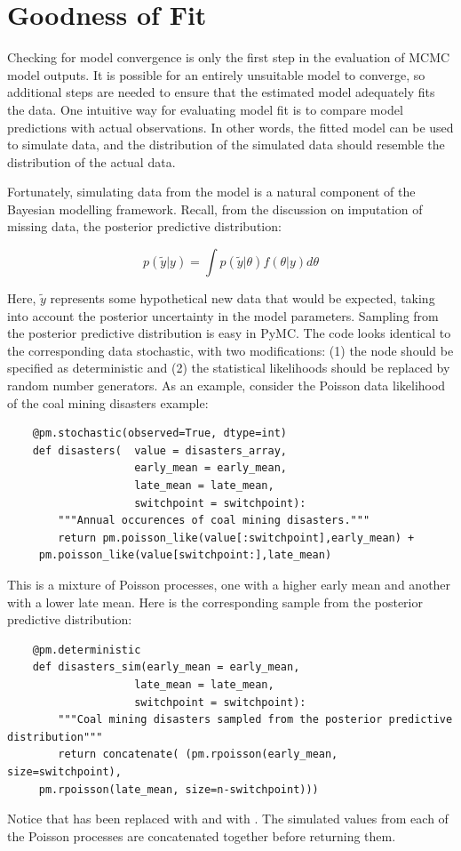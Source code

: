 
\hypertarget{gof}{}
\section{Goodness of Fit} %

Checking for model convergence is only the first step in the evaluation of MCMC model outputs. It is possible for an entirely unsuitable model to converge, so additional steps are needed to ensure that the estimated model adequately fits the data. One intuitive way for evaluating model fit is to compare model predictions with actual observations. In other words, the fitted model can be used to simulate data, and the distribution of the simulated data should resemble the distribution of the actual data.

Fortunately, simulating data from the model is a natural component of the Bayesian modelling framework. Recall, from the discussion on imputation of missing data, the posterior predictive distribution:

\begin{equation}
	p(\tilde{y}|y) = \int p(\tilde{y}|\theta) f(\theta|y) d\theta
\end{equation}

Here, $\tilde{y}$ represents some hypothetical new data that would be expected, taking into account the posterior uncertainty in the model parameters. Sampling from the posterior predictive distribution is easy in PyMC. The code looks identical to the corresponding data stochastic, with two modifications: (1) the node should be specified as deterministic and (2) the statistical likelihoods should be replaced by random number generators. As an example, consider the Poisson data likelihood of the coal mining disasters example:
\begin{verbatim}
	@pm.stochastic(observed=True, dtype=int)
	def disasters(  value = disasters_array,
	                early_mean = early_mean,
	                late_mean = late_mean,
	                switchpoint = switchpoint):
	    """Annual occurences of coal mining disasters."""
	    return pm.poisson_like(value[:switchpoint],early_mean) +
	 pm.poisson_like(value[switchpoint:],late_mean)
\end{verbatim}
This is a mixture of Poisson processes, one with a higher early mean and another with a lower late mean. Here is the corresponding sample from the posterior predictive distribution:
\begin{verbatim}
	@pm.deterministic
	def disasters_sim(early_mean = early_mean,
	                late_mean = late_mean,
	                switchpoint = switchpoint):
	    """Coal mining disasters sampled from the posterior predictive distribution"""
	    return concatenate( (pm.rpoisson(early_mean, size=switchpoint),
	 pm.rpoisson(late_mean, size=n-switchpoint)))
\end{verbatim}
Notice that  has been replaced with  and  with . The simulated values from each of the Poisson processes are concatenated together before returning them.

